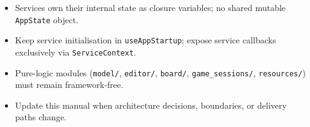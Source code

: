 \documentclass[]{article}
\begin{document}
\begin{itemize}
  write to it during operations and flush to React via callbacks or
  \texttt{flushSessionState()} when the operation completes (see §7.3).
  This is an intentional performance trade-off, not a violation.
\item
  Services own their internal state as closure variables; no shared
  mutable \texttt{AppState} object.
\item
  Keep service initialisation in \texttt{useAppStartup}; expose service
  callbacks exclusively via \texttt{ServiceContext}.
\item
  Pure-logic modules (\texttt{model/}, \texttt{editor/},
  \texttt{board/}, \texttt{game\_sessions/}, \texttt{resources/}) must
  remain framework-free.
\item
  Update this manual when architecture decisions, boundaries, or
  delivery paths change.
\end{itemize}
\end{document}

